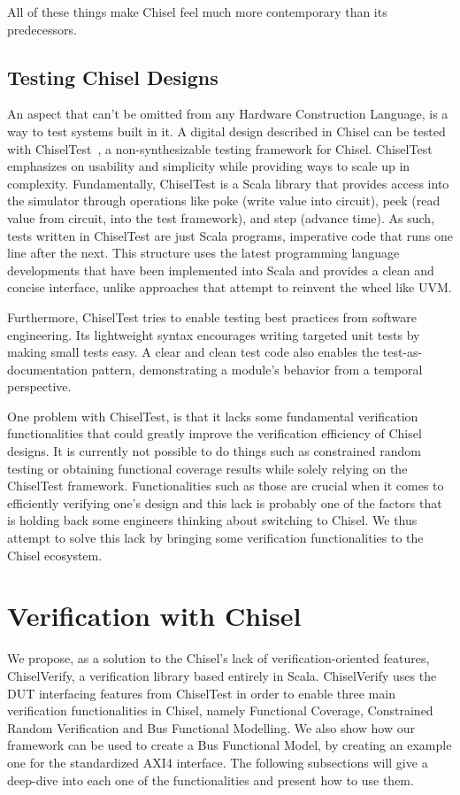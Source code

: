 \documentclass[conference]{IEEEtran}
\newcommand{\todo}[1]{{\color{olive} TODO: #1}}
\begin{document}
All of these things make Chisel feel much more contemporary than its predecessors.

\subsection{Testing Chisel Designs}
An aspect that can't be omitted from any Hardware Construction Language, is a way to test systems built in it.
A digital design described in Chisel can be tested with ChiselTest~\cite{chisel:tester2}, a non-synthesizable testing framework for Chisel.
ChiselTest emphasizes on usability and simplicity while providing ways to scale up in complexity.
Fundamentally, ChiselTest is a Scala library that provides access into the simulator through
operations like poke (write value into circuit), peek (read value from circuit, into the test framework), and step (advance time).
As such, tests written in ChiselTest are just Scala programs, imperative code that runs one line after the next.
This structure uses the latest programming language developments that have been implemented into Scala
and provides a clean and concise interface, unlike approaches that attempt to reinvent the wheel like UVM.

Furthermore, ChiselTest tries to enable testing best practices from software engineering.
Its lightweight syntax encourages writing targeted unit tests by making small tests easy.
A clear and clean test code also enables the test-as-documentation pattern,
demonstrating a module's behavior from a temporal perspective.

One problem with ChiselTest, is that it lacks some fundamental verification functionalities that could greatly improve the verification efficiency of Chisel designs. 
It is currently not possible to do things such as constrained random testing or obtaining functional coverage results while solely relying on the ChiselTest framework. 
Functionalities such as those are crucial when it comes to efficiently verifying one's design and this lack is probably one of the factors that is holding back some engineers thinking about switching to Chisel. 
We thus attempt to solve this lack by bringing some verification functionalities to the Chisel ecosystem. 


\section{Verification with Chisel}

We propose, as a solution to the Chisel's lack of verification-oriented features, ChiselVerify, a verification library based entirely in Scala. ChiselVerify uses the DUT interfacing features from ChiselTest in order to enable three main verification functionalities in Chisel, namely Functional Coverage, Constrained Random Verification and Bus Functional Modelling. We also show how our framework can be used to create a Bus Functional Model, by creating an example one for the standardized AXI4 interface. The following subsections will give a deep-dive into each one of the functionalities and present how to use them.
\end{document}

